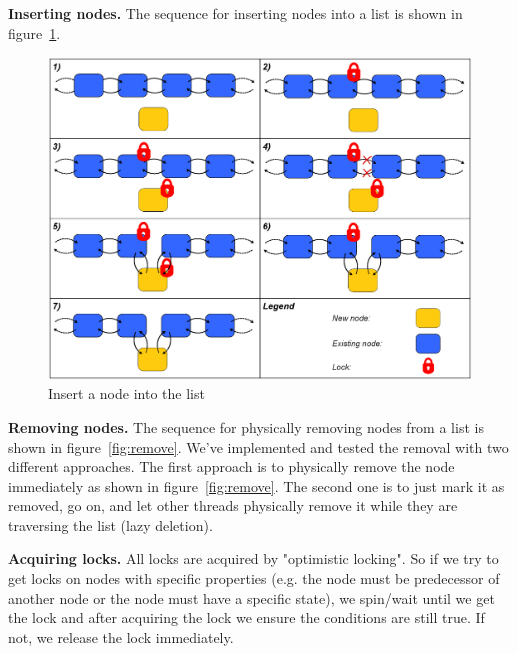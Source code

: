 \documentclass[letterpaper]{article}
\newcommand{\mypar}[1]{{\bf #1.}}
\begin{document}
\mypar{Inserting nodes}
The sequence for inserting nodes into a list is shown in figure~\ref{fig:insert}.

\begin{figure}[h]\centering
  \includegraphics[scale=0.31]{insert.eps}
  \caption{Insert a node into the list \label{fig:insert}}
\end{figure}

\mypar{Removing nodes}
The sequence for physically removing nodes from a list is shown in  figure~\ref{fig:remove}. We've implemented and tested the removal with two different approaches. The first approach is to physically remove the node immediately as shown in figure~\ref{fig:remove}. The second one is to just mark it as removed, go on, and let other threads physically remove it while they are traversing the list (lazy deletion).

\mypar{Acquiring locks}
All locks are acquired by "optimistic locking". So if we try to get locks on nodes with specific properties (e.g. the node must be predecessor of another node or the node must have a specific state), we spin/wait until we get the lock and after acquiring the lock we ensure the conditions are still true. If not, we release the lock immediately.
\end{document}

